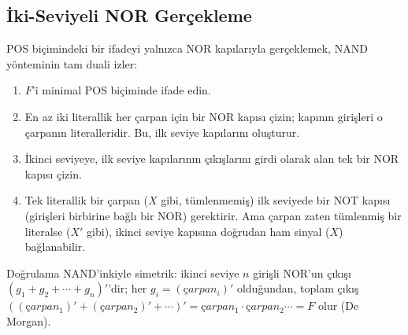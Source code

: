 \subsection{İki-Seviyeli NOR Gerçekleme}\label{sec:nandnor-iki-seviyeli-nor}
POS biçimindeki bir ifadeyi yalnızca NOR kapılarıyla gerçeklemek, NAND yönteminin tam
duali izler:
\begin{enumerate}[nosep, leftmargin=*]
    \item $F$'i minimal POS biçiminde ifade edin.
    \item En az iki literallik her çarpan için bir NOR kapısı çizin; kapının girişleri o
    çarpanın literalleridir. Bu, ilk seviye kapılarını oluşturur.
    \item İkinci seviyeye, ilk seviye kapılarının çıkışlarını girdi olarak alan tek bir
    NOR kapısı çizin.
    \item Tek literallik bir çarpan ($X$ gibi, tümlenmemiş) ilk seviyede bir NOT kapısı
    (girişleri birbirine bağlı bir NOR) gerektirir. Ama çarpan zaten tümlenmiş bir
    literalse ($X'$ gibi), ikinci seviye kapısına doğrudan ham sinyal ($X$) bağlanabilir.
\end{enumerate}
Doğrulama NAND'inkiyle simetrik: ikinci seviye $n$ girişli NOR'un çıkışı
$(g_1+g_2+\cdots+g_n)'$'dir; her $g_i=(çarpan_i)'$ olduğundan, toplam çıkış
$((çarpan_1)'+(çarpan_2)'+\cdots)'=çarpan_1\cdot çarpan_2\cdots=F$ olur (De Morgan).

